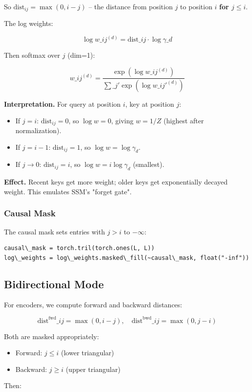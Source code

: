 So $\text{dist}_{ij} = \max(0, i - j)$ -- the distance from position $j$ to 
position $i$ \textbf{for $j \leq i$}.

The log weights:

\[
\log w\_{ij}^{(d)} = \text{dist}\_{ij} \cdot \log \gamma\_d
\tag{4.6}
\]

Then softmax over $j$ (dim=1):

\[
w\_{ij}^{(d)} = \frac{\exp(\log w\_{ij}^{(d)})}{\sum\_{j'} \exp(\log w\_{ij'}^{(d)})}
\tag{4.7}
\]

\textbf{Interpretation.} For query at position $i$, key at position $j$:

\begin{itemize}
\item If $j = i$: $\text{dist}_{ij} = 0$, so $\log w = 0$, giving $w = 1/Z$
  (highest after normalization).
\item If $j = i - 1$: $\text{dist}_{ij} = 1$, so $\log w = \log \gamma_d$.
\item If $j \to 0$: $\text{dist}_{ij} = i$, so $\log w = i \log \gamma_d$
  (smallest).

\end{itemize}
\textbf{Effect.} Recent keys get more weight; older keys get exponentially 
decayed weight. This emulates SSM's "forget gate".

\subsubsection{Causal Mask}

The causal mask sets entries with $j > i$ to $-\infty$:

\begin{lstlisting}
causal\_mask = torch.tril(torch.ones(L, L))
log\_weights = log\_weights.masked\_fill(~causal\_mask, float("-inf"))
\end{lstlisting}

\subsection{Bidirectional Mode}

For encoders, we compute forward and backward distances:

\[
\text{dist}^\text{fwd}\_{ij} = \max(0, i - j), \quad
\text{dist}^\text{bwd}\_{ij} = \max(0, j - i)
\tag{4.8}
\]

Both are masked appropriately:

\begin{itemize}
\item Forward: $j \leq i$ (lower triangular)
\item Backward: $j \geq i$ (upper triangular)

\end{itemize}
Then:

